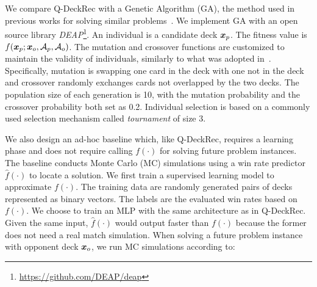 We compare Q-DeckRec with a Genetic Algorithm (GA), the method used in previous works for solving similar problems~\citep{garcia2016evolutionary,bjorke2017deckbuilding}. We implement GA with an open source library \textit{DEAP}\footnote{\url{https://github.com/DEAP/deap}}. An individual is a candidate deck $\boldsymbol{x}_p$. The fitness value is $f(\boldsymbol{x}_p; \boldsymbol{x}_o, \mathcal{A}_p, \mathcal{A}_o)$. The mutation and crossover functions are customized to maintain the validity of individuals, similarly to what was adopted in~\textcite{bjorke2017deckbuilding}. Specifically, mutation is swapping one card in the deck with one not in the deck and crossover randomly exchanges cards not overlapped by the two decks. The population size of each generation is 10, with the mutation probability and the crossover probability both set as 0.2. Individual selection is based on a commonly used selection mechanism called \textit{tournament} of size 3. 


We also design an ad-hoc baseline which, like Q-DeckRec, requires a learning phase and does not require calling $f(\cdot)$ for solving future problem instances. The baseline conducts Monte Carlo (MC) simulations using a win rate predictor $\hat{f}(\cdot)$ to locate a solution. We first train a supervised learning model to approximate $f(\cdot)$. The training data are randomly generated pairs of decks represented as binary vectors. The labels are the evaluated win rates based on $f(\cdot)$. We choose to train an MLP with the same architecture as in Q-DeckRec. Given the same input, $\hat{f}(\cdot)$ would output faster than $f(\cdot)$ because the former does not need a real match simulation. When solving a future problem instance with opponent deck $\boldsymbol{x}_o$, we run MC simulations according to:

